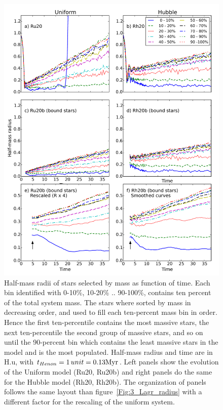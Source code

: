 \begin{figure}
\begin{center}
\includegraphics[width=\textwidth,clip=true]{Figures/3_Rhm_segr}
\caption{Half-mass radii of stars selected by mass as function of time. Each bin identified with 0-10\%, 10-20\% .. 90-100\%, contains ten percent of the total system mass. The stars where sorted by mass in decreasing order, and used to fill each ten-percent mass bin in order. Hence the first ten-percentile contains the most massive stars, the next ten-percentile the second group of massive stars, and so on until the 90-percent bin which contains the least massive stars in the model and is the most populated. Half-mass radius and time are in H.u, with $t_{Henon} = 1\,unit = 0.13 {\textrm{Myr}}$. Left panels show the evolution of the Uniform model (Ru20, Ru20b) and right panels do the same for the Hubble model (Rh20, Rh20b). The organization of panels follows the same layout than figure~\ref{Fig:3_Lagr_radius} with a different factor for the rescaling of the uniform system. }
\label{Fig:3_Rhm_segr}
\end{center}
\end{figure}

